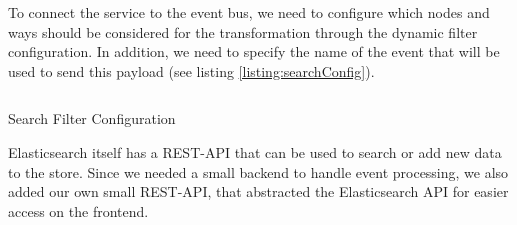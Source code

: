 \documentclass[conference]{IEEEtran}
\begin{document}
To connect the service to the event bus, we need to configure which nodes and ways should be considered for the transformation through the dynamic filter configuration. In addition, we need to specify the name of the event that will be used to send this payload (see listing \ref{listing:searchConfig}). 

\begin{listing}[h]
    \inputminted{json}{listings/searchConfig.json}
    \caption{Search Filter Configuration}
    \label{listing:searchConfig}
\end{listing}

Elasticsearch itself has a REST-API that can be used to search or add new data to the store. Since we needed a small backend to handle event processing, we also added our own small REST-API, that abstracted the Elasticsearch API for easier access on the frontend.
\end{document}
